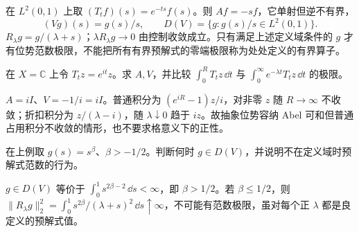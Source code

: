 \begin{example}[乘法位势的定义域]
在 $L^2(0,1)$ 上取 $(T_tf)(s)=e^{-ts}f(s)$。则 $Af=-sf$，它单射但逆不有界，
\[
 (Vg)(s)=g(s)/s,\qquad D(V)=\{g:g(s)/s\in L^2(0,1)\}.
\]
$R_\lambda g=g/(\lambda+s)$；$\lambda R_\lambda g\to0$ 由控制收敛成立。只有满足上述定义域条件的 $g$ 才有位势范数极限，不能把所有有界预解式的零端极限称为处处定义的有界算子。
\end{example}

\begin{exercise}\label{ex:y13-abel-oscillation}
在 $X=\mathbb C$ 上令 $T_tz=e^{it}z$。求 $A,V$，并比较 $\int_0^R T_tz\,\dd t$ 与 $\int_0^\infty e^{-\lambda t}T_tz\,\dd t$ 的极限。
\end{exercise}
\begin{solution}
$A=iI$、$V=-1/i=iI$。普通积分为 $(e^{iR}-1)z/i$，对非零 $z$ 随 $R\to\infty$ 不收敛；折扣积分为 $z/(\lambda-i)$，随 $\lambda\downarrow0$ 趋于 $iz$。故抽象位势容纳 Abel 可和但普通占用积分不收敛的情形，也不要求格意义下的正性。
\end{solution}

\begin{exercise}[乘法位势的临界指数]\label{ex:y13-potential-domain}
在上例取 $g(s)=s^\beta$、$\beta>-1/2$。判断何时 $g\in D(V)$，并说明不在定义域时预解式范数的行为。
\end{exercise}
\begin{solution}
$g\in D(V)$ 等价于 $\int_0^1s^{2\beta-2}\,\dd s<\infty$，即 $\beta>1/2$。若 $\beta\le1/2$，则 $\|R_\lambda g\|_2^2=\int_0^1s^{2\beta}/(\lambda+s)^2\,\dd s\uparrow\infty$，不可能有范数极限，虽对每个正 $\lambda$ 都是良定义的预解式值。
\end{solution}
